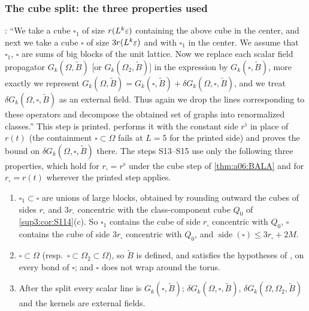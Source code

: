 
\subsubsection{The cube split: the three properties used}\label{sup3:ssec:S12}

\cite[p.~433]{Ba3}: ``We take a cube $\square_1$ of size $r(L^k\varepsilon)$ containing the above cube in the center, and next we take a cube $\square$ of size $3r(L^k\varepsilon)$ and with $\square_1$ in the center. We assume that $\square_1$, $\square$ are sums of big blocks of the unit lattice. Now we replace each scalar field propagator $G_k(\Omega,\tilde B)$ [or $G_k(\Omega_2,\tilde B)$] in the expression by $G_k(\square,\tilde B)$, more exactly we represent $G_k(\Omega,\tilde B)=G_k(\square,\tilde B)+\delta G_k(\Omega,\square,\tilde B)$, and we treat $\delta G_k(\Omega,\square,\tilde B)$ as an external field. Thus again we drop the lines corresponding to these operators and decompose the obtained set of graphs into renormalized classes.'' This step is printed.  performs it with the constant side $r^\flat$ in place of $r(t)$ (the containment $\square\subset\Omega$ fails at $L=5$ for the printed side) and proves the bound on $\delta G_k(\Omega,\square,\tilde B)$ there. The steps S13--S15 use only the following three properties, which hold for $r_\square=r^\flat$ under the cube step of \cref{thm:a06:BALA} and for $r_\square=r(t)$ wherever the printed step applies.
\begin{enumerate}[label=\textup{(P-\roman*)},nosep,leftmargin=*]
\item $\square_1\subset\square$ are unions of large blocks, obtained by rounding outward the cubes of sides $r_\square$ and $3r_\square$ concentric with the class-component cube $Q_0$ of \cref{sup3:cor:S114}(c). So $\square_1$ contains the cube of side $r_\square$ concentric with $Q_0$, $\square$ contains the cube of side $3r_\square$ concentric with $Q_0$, and $\operatorname{side}(\square)\le3r_\square+2M$.
\item $\square\subset\Omega$ (resp.\ $\square\subset\Omega_2\subset\Omega$), so $\tilde B$ is defined, and satisfies the hypotheses of \cite[p.~412]{Ba3}, on every bond of $\square$; and $\square$ does not wrap around the torus.
\item After the split every scalar line is $G_k(\square,\tilde B)$; $\delta G_k(\Omega,\square,\tilde B)$, $\delta G_k(\Omega,\Omega_2,\tilde B)$ and the kernels \cite[(1.16)]{Ba3} are external fields.
\end{enumerate}

